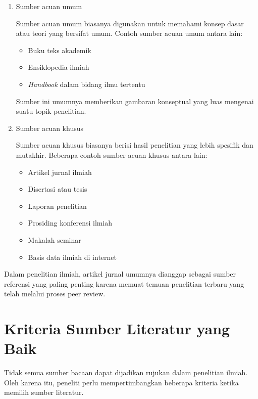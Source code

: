 \documentclass[
  indonesian,
  letterpaper,
  DIV=11,
  numbers=noendperiod]{scrreprt}
\providecommand{\tightlist}{%
  \setlength{\itemsep}{0pt}\setlength{\parskip}{0pt}}
\begin{document}
\begin{enumerate}
\def\labelenumi{\arabic{enumi}.}
\item
  Sumber acuan umum

  Sumber acuan umum biasanya digunakan untuk memahami konsep dasar atau
  teori yang bersifat umum. Contoh sumber acuan umum antara lain:

  \begin{itemize}
  \tightlist
  \item
    Buku teks akademik
  \item
    Ensiklopedia ilmiah
  \item
    \emph{Handbook} dalam bidang ilmu tertentu
  \end{itemize}

  Sumber ini umumnya memberikan gambaran konseptual yang luas mengenai
  suatu topik penelitian.
\item
  Sumber acuan khusus

  Sumber acuan khusus biasanya berisi hasil penelitian yang lebih
  spesifik dan mutakhir. Beberapa contoh sumber acuan khusus antara
  lain:

  \begin{itemize}
  \tightlist
  \item
    Artikel jurnal ilmiah
  \item
    Disertasi atau tesis
  \item
    Laporan penelitian
  \item
    Prosiding konferensi ilmiah
  \item
    Makalah seminar
  \item
    Basis data ilmiah di internet
  \end{itemize}
\end{enumerate}

Dalam penelitian ilmiah, artikel jurnal umumnya dianggap sebagai sumber
referensi yang paling penting karena memuat temuan penelitian terbaru
yang telah melalui proses peer review.

\section{Kriteria Sumber Literatur yang
Baik}\label{kriteria-sumber-literatur-yang-baik}

Tidak semua sumber bacaan dapat dijadikan rujukan dalam penelitian
ilmiah. Oleh karena itu, peneliti perlu mempertimbangkan beberapa
kriteria ketika memilih sumber literatur.
\end{document}
